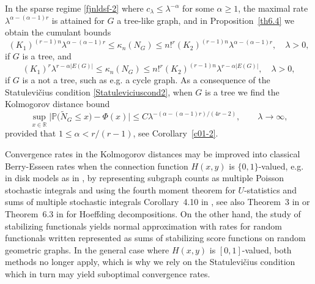 \documentclass[12pt]{article}
\def\real{{\mathord{\mathbb R}}}
\def\P{\mathbb{P}}
\numberwithin{equation}{section}
\begin{document}
 In the sparse regime \eqref{fjnldsf-2} where
 $ c_\lambda \leq \lambda^{-\alpha}$ for some $\alpha \geq 1$,
 the maximal rate $\lambda^{
 \alpha         -(\alpha - 1)r 
          }$
 is attained for $G$ a tree-like graph, and
 in Proposition~\ref{th6.4} we obtain the cumulant bounds %
$$ 
    \nonumber %
            (K_1)^{(r-1)n}
    \lambda^{
 \alpha     -(\alpha - 1)r 
      }
     \leq 
  \kappa_n(N_G)
  \leq
  n!^r
  (K_2)^{(r-1)n}
  \lambda^{
   \alpha -(\alpha - 1)r 
    } 
  , \quad \lambda > 0, 
$$ 
  if $G$ is a tree, and
$$ 
  \nonumber %
    (K_1)^r 
  \lambda^{r-\alpha |E(G)|}
  \leq 
  \kappa_n(N_G)
  \leq
    n!^r
    (K_2)^{(r-1)n}
    \lambda^{r-\alpha |E(G)|}, \quad \lambda >0, 
$$ 
  if $G$ is a not a tree, such as e.g. a cycle graph.
  As a consequence of the {Statulevi\v{c}ius condition}
  \eqref{Statuleviciuscond2}, 
 when $G$ is a tree
 we find the Kolmogorov distance bound %
$$  
\sup_{x\in \real}
\big| \P \big( \widetilde{N}_G \leq x \big) - \Phi (x) \big| \leq
 C \lambda^{
    - (
\alpha    -(\alpha - 1)r 
        ) / ( 4r - 2) }
, \qquad \lambda \to \infty, 
$$ 
 provided that $1 \leq \alpha < r/(r-1)$, 
 see Corollary~\ref{c01-2}. 
 
 \medskip 
 
 Convergence rates in the Kolmogorov distances may be improved
 into classical Berry-Esseen rates when 
 the connection function $H(x,y)$ is $\{0,1\}$-valued, e.g. in disk models
 as in \cite{privaultkhops}, 
 by representing subgraph counts as multiple Poisson stochastic integrals
 and using the fourth moment theorem for $U$-statistics and sums of
 multiple stochastic integrals Corollary~4.10 in \cite{eichelsbacher}, 
 see also Theorem~3 in \cite{lachieze-rey} 
 or Theorem~6.3 in \cite{PS4} for Hoeffding decompositions.
 On the other hand, the study of stabilizing functionals \cite{penrose05,lachiezerey4} yields normal approximation with rates for random functionals written represented as sums of stabilizing score functions on random geometric graphs. In the general case where $H(x,y)$ is $[0,1]$-valued, both methods no longer apply, which is why we rely on the {Statulevi\v{c}ius condition} which in turn may yield suboptimal convergence rates. 
 
 \medskip
\end{document}
